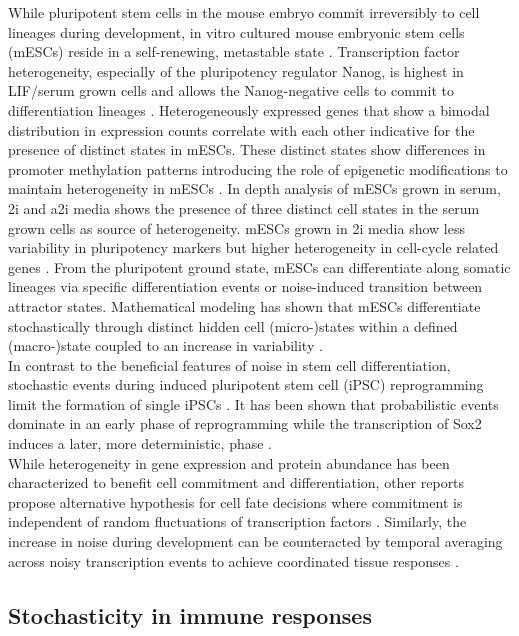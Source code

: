 While pluripotent stem cells in the mouse embryo commit irreversibly to cell lineages during development, in vitro cultured mouse embryonic stem cells (mESCs) reside in a self-renewing, metastable state \citep{Hayashi2013}. Transcription factor heterogeneity, especially of the pluripotency regulator Nanog, is highest in LIF/serum grown cells and allows the Nanog-negative cells to commit to differentiation lineages \citep{Chickarmane2012, Torres-Padilla2014}. Heterogeneously expressed genes that show a bimodal distribution in expression counts correlate with each other indicative for the presence of distinct states in mESCs. These distinct states show differences in promoter methylation patterns introducing the role of epigenetic modifications to maintain heterogeneity in mESCs \citep{Singer2014a}. In depth analysis of mESCs grown in serum, 2i and a2i media shows the presence of three distinct cell states in the serum grown cells as source of heterogeneity. mESCs grown in 2i media show less variability in pluripotency markers but higher heterogeneity in cell-cycle related genes \citep{Kolodziejczyk2015a}. From the pluripotent ground state, mESCs can differentiate along somatic lineages via specific differentiation events or noise-induced transition between attractor states. Mathematical modeling has shown that mESCs differentiate stochastically through distinct hidden cell (micro-)states within a defined (macro-)state coupled to an increase in variability \cite{Stumpf2017}.\\

In contrast to the beneficial features of noise in stem cell differentiation, stochastic events during induced pluripotent stem cell (iPSC) reprogramming limit the formation of single iPSCs \citep{Hanna2009, Yamanaka2009}. It has been shown that probabilistic events dominate in an early phase of reprogramming while the transcription of Sox2 induces a later, more deterministic, phase \cite{Buganim2012}.\\
While heterogeneity in gene expression and protein abundance has been characterized to benefit cell commitment and differentiation, other reports propose alternative hypothesis for cell fate decisions where commitment is independent of random fluctuations of transcription factors \cite{Hoppe2016}. Similarly, the increase in noise during development can be counteracted by temporal averaging across noisy transcription events to achieve coordinated tissue responses \citep{Stapel2017}. 

\subsection{Stochasticity in immune responses}


